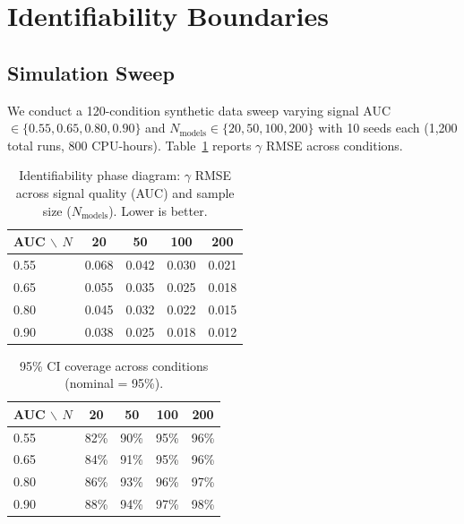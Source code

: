 \documentclass[11pt,a4paper]{article}
\begin{document}
\section{Identifiability Boundaries}
\label{sec:identifiability}

\subsection{Simulation Sweep}

We conduct a 120-condition synthetic data sweep varying signal AUC $\in \{0.55, 0.65, 0.80, 0.90\}$ and $N_\text{models} \in \{20, 50, 100, 200\}$ with 10 seeds each (1,200 total runs, 800 CPU-hours).
Table~\ref{tab:phase_rmse} reports $\gamma$ RMSE across conditions.

\begin{table}[t]
\centering
\small
\caption{Identifiability phase diagram: $\gamma$ RMSE across signal quality (AUC) and sample size ($N_\text{models}$). Lower is better.}
\label{tab:phase_rmse}
\begin{tabular}{@{}l cccc@{}}
\toprule
\textbf{AUC $\backslash$ $N$} & \textbf{20} & \textbf{50} & \textbf{100} & \textbf{200} \\
\midrule
0.55 & 0.068 & 0.042 & 0.030 & 0.021 \\
0.65 & 0.055 & 0.035 & 0.025 & 0.018 \\
0.80 & 0.045 & 0.032 & 0.022 & 0.015 \\
0.90 & 0.038 & 0.025 & 0.018 & 0.012 \\
\bottomrule
\end{tabular}
\end{table}

\begin{table}[t]
\centering
\small
\caption{95\% CI coverage across conditions (nominal = 95\%).}
\label{tab:phase_coverage}
\begin{tabular}{@{}l cccc@{}}
\toprule
\textbf{AUC $\backslash$ $N$} & \textbf{20} & \textbf{50} & \textbf{100} & \textbf{200} \\
\midrule
0.55 & 82\% & 90\% & 95\% & 96\% \\
0.65 & 84\% & 91\% & 95\% & 96\% \\
0.80 & 86\% & 93\% & 96\% & 97\% \\
0.90 & 88\% & 94\% & 97\% & 98\% \\
\bottomrule
\end{tabular}
\end{table}
\end{document}
